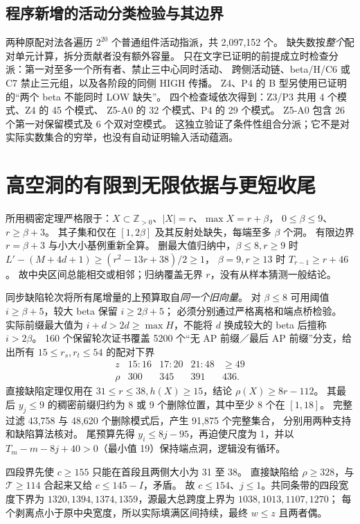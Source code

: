 \documentclass[11pt,a4paper]{article}
\newcommand{\Z}{\mathbb Z}
\newcommand{\T}{\mathcal T}
\begin{document}
\subsection*{程序新增的活动分类检验与其边界}
两种原配对法各遍历 $2^{20}$ 个普通组件活动指派，共 2,097,152 个。
缺失数按\emph{整个}配对单元计算，拆分贡献者没有额外容量。
只在文字已证明的前提成立时检查分派：第一对至多一个所有者、禁止三中心同时活动、
跨侧活动链、beta/H/C6 或 C7 禁止三元组，以及各阶段的同侧 HIGH 传播。
Z4、P4 的 B 型另使用已证明的“两个 beta 不能同时 LOW 缺失”。
四个检查域依次得到：Z3/P3 共用 4 个模式、Z4 的 45 个模式、
Z5-A0 的 32 个模式、P4 的 29 个模式。
Z5-A0 包含 26 个第一对保留模式及 6 个双对空模式。
这独立验证了条件性组合分派；它不是对实际实数集合的穷举，也没有自动证明输入活动蕴涵。

\clearpage
\section{高空洞的有限到无限依据与更短收尾}\label{dense}
所用稠密定理严格限于：$X\subset\Z_{>0}$、$|X|=r$、$\max X=r+\beta$，
$0\le\beta\le9$、$r\ge\beta+3$。
其子集和仅在 $[1,2\beta]$ 及其反射处缺失，每端至多 $\beta$ 个洞。
有限边界 $r=\beta+3$ 与小大小基例重新全算。
删最大值归纳中，$\beta\le8,r\ge9$ 时
$L'-(M+4d+1)\ge(r^2-13r+38)/2\ge1$，
$\beta=9,r\ge13$ 时 $T_{r-1}\ge r+46$。
故中央区间总能相交或相邻；归纳覆盖无界 $r$，没有从样本猜测一般结论。

同步缺陷轮次将所有尾增量的上预算取自\emph{同一个旧向量}。
对 $\beta\le8$ 可用阈值 $i\ge\beta+5$，较大 beta 保留 $i\ge2\beta+5$；
必须分别通过严格离格和端点桥检验。
实际前缀最大值为 $i+d>2d\ge\max H$，不能将 $d$ 换成较大的 beta 后擅称 $i>2\beta$。
160 个保留轮次证书覆盖 5200 个“无 AP 前缀／最后 AP 前缀”分支，给出所有
$15\le r_s,r_t\le54$ 的配对下界
\[
\begin{array}{c|cccc}
z&15\!:\!16&17\!:\!20&21\!:\!48&\ge49\\\hline
\rho&300&345&391&436.
\end{array}
\]
直接缺陷定理仅用在 $31\le r\le38,h(X)\ge15$，结论 $\rho(X)\ge8r-112$。
其最后 $y_j\le9$ 的稠密前缀归约为 8 或 9 个删除位置，其中至少 8 个在 $[1,18]$。
完整过滤 43,758 与 48,620 个删除模式后，产生 91,875 个完整集合，
分别用两种支持和缺陷算法核对。
尾预算先得 $y_i\le8j-95$，再迫使尺度为 1，并以
$T_m-m-8j+40>0$（最小值 19）保持端点洞，逻辑没有循环。

四段界先使 $c\ge155$ 只能在首段且两侧大小为 31 至 38。
直接缺陷给 $\rho\ge328$，与 $\T\ge114$ 合起来又给 $c\le145-I$，矛盾。
故 $c\le154$、$j\le1$。共同条带的四段宽度下界为
$1320,1394,1374,1359$，源最大总跨度上界为 $1038,1013,1107,1270$；
每个剥离点小于原中央宽度，所以实际填满区间持续，最终 $w\le z$ 且两者偶。
\end{document}
